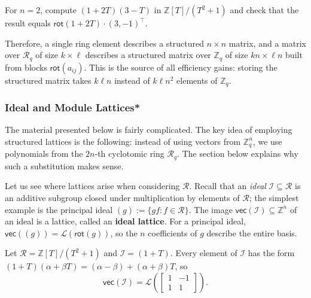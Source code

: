 \documentclass[../../book.tex]{subfiles}
\begin{document}
\begin{exercise}
    For $n=2$, compute $(1+2T)(3-T)$ in $\mathbb{Z}[T]/(T^2+1)$ and check that the result equals $\mathsf{rot}(1+2T)\cdot(3,-1)^{\top}$.
\end{exercise}

Therefore, a single ring element describes a structured $n \times n$ matrix, and a matrix over $\mathcal{R}_q$ of size $k \times \ell$ describes a structured matrix over $\mathbb{Z}_q$ of size $kn \times \ell n$ built from blocks $\mathsf{rot}(a_{ij})$.
This is the source of all efficiency gains: storing the structured matrix takes $k\ell n$ instead of $k\ell n^2$ elements of $\mathbb{Z}_q$.

\subsubsection{Ideal and Module Lattices*}

\begin{remark}
    The material presented below is fairly complicated. 
    The key idea of employing structured lattices is the following: instead of using vectors from $\mathbb{Z}_q^n$, we use polynomials from the $2n$-th cyclotomic ring $\mathcal{R}_q$.
    The section below explains why such a substitution makes sense.
\end{remark}

Let us see where lattices arise when considering $\mathcal{R}$.
Recall that an \emph{ideal} $\mathcal{I} \subseteq \mathcal{R}$ is an additive subgroup closed under multiplication by elements of $\mathcal{R}$; the simplest example is the principal ideal $(g) := \{gf: f \in \mathcal{R}\}$.
The image $\mathsf{vec}(\mathcal{I}) \subseteq \mathbb{Z}^n$ of an ideal is a lattice, called an \textbf{ideal lattice}.
For a principal ideal, $\mathsf{vec}((g)) = \mathcal{L}(\mathsf{rot}(g))$, so the $n$ coefficients of $g$ describe the entire basis.

\begin{example}
    Let $\mathcal{R} = \mathbb{Z}[T]/(T^2+1)$ and $\mathcal{I} = (1+T)$.
    Every element of $\mathcal{I}$ has the form $(1+T)(\alpha+\beta T) = (\alpha-\beta) + (\alpha+\beta)T$, so
    \begin{equation*}
        \mathsf{vec}(\mathcal{I}) = \mathcal{L}\left(\begin{bmatrix} 1 & -1 \\ 1 & 1 \end{bmatrix}\right).
    \end{equation*}
\end{example}
\end{document}
